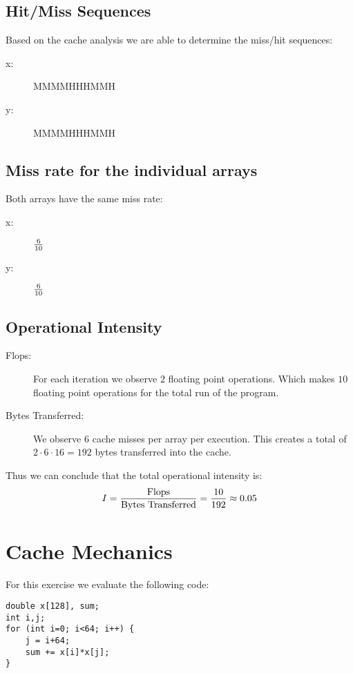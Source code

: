 \documentclass[portrait,a4paper]{article}
\begin{document}
\subsection{Hit/Miss Sequences}
Based on the cache analysis we are able to determine the miss/hit sequences:
\begin{description}
\item[x:]MMMMHHHMMH
\item[y:]MMMMHHHMMH
\end{description}

\subsection{Miss rate for the individual arrays}
Both arrays have the same miss rate:
\begin{description}
\item[x:] ${6\over 10}$
\item[y:] ${6\over 10}$
\end{description}

\subsection{Operational Intensity}
\begin{description}
\item[Flops:] For each iteration we observe $2$ floating point operations. Which makes $10$ floating point operations for the total run of the program.
\item[Bytes Transferred:] We observe $6$ cache misses per array per execution. This creates a total of $2\cdot 6\cdot 16 = 192$ bytes transferred into the cache.
\end{description}

Thus we can conclude that the total operational intensity is:
\begin{align*}
I = {\text{Flops} \over \text{Bytes Transferred}} = {10\over 192} \approx 0.05
\end{align*}

\section{Cache Mechanics}
For this exercise we evaluate the following code:
\begin{lstlisting}
double x[128], sum;
int i,j;
for (int i=0; i<64; i++) {
    j = i+64;
    sum += x[i]*x[j];
}
\end{lstlisting}
\end{document}

